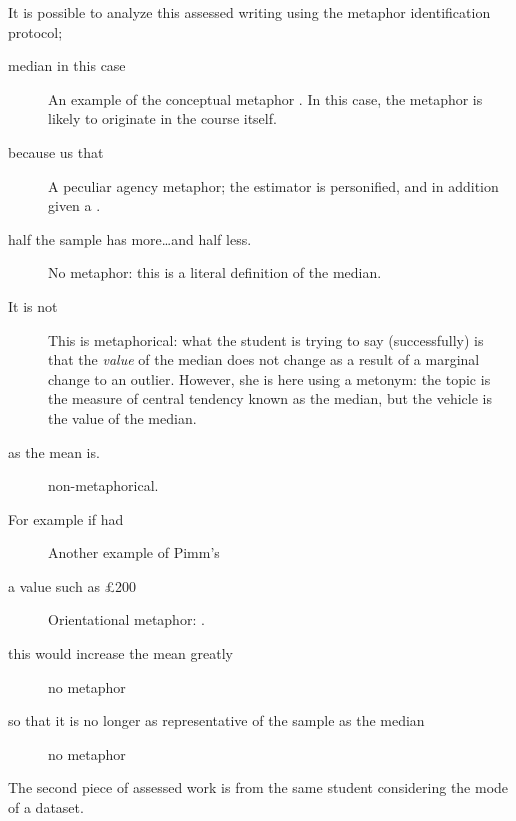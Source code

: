 \noindent It is possible to analyze this assessed writing using the
 metaphor identification protocol;

\begin{description}
\item[ median  in this case]\qquad An
  example of the conceptual metaphor .  In
  this case, the metaphor is likely to originate in the course itself.
\item[because  us that]\qquad A peculiar agency
  metaphor; the estimator is personified, and in addition given a
  .
\item[half the sample has more\ldots and half less.]\qquad No
  metaphor: this is a literal definition of the median.
\item[It is not ]\qquad This is
  metaphorical: what the student is trying to say (successfully) is
  that the \emph{value} of the median does not change as a result of a
  marginal change to an outlier.  However, she is here using a
  metonym: the topic is the measure of central tendency known as the
  median, but the vehicle is the value of the median.
\item[as the mean is.]\qquad non-metaphorical.
\item[For example if  had]\qquad Another example of
  Pimm's 
\item[a  value such as \pounds 200]\qquad
  Orientational metaphor: .
\item[this would increase the mean greatly]\qquad no metaphor
\item[so that it is no longer as representative of the sample as the
  median]\qquad no metaphor
\end{description}
  
\noindent
The second piece of assessed work is from the same student considering
the mode of a dataset.


\begin{singlespace}
\begin{quote}
\end{quote}
\end{singlespace}

